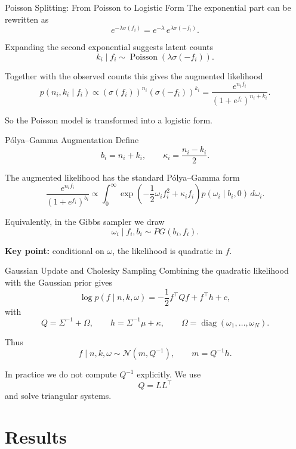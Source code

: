 \documentclass[11pt]{beamer}
\newcommand{\sigmoid}{\sigma}
\begin{document}
\begin{frame}{Poisson Splitting: From Poisson to Logistic Form}
The exponential part can be rewritten as
\[
e^{-\lambda\sigmoid(f_i)}
=
e^{-\lambda}\,e^{\lambda\sigmoid(-f_i)}.
\]

Expanding the second exponential suggests latent counts
\[
k_i\mid f_i \sim \operatorname{Poisson}(\lambda\sigmoid(-f_i)).
\]

Together with the observed counts this gives the augmented likelihood
\[
p(n_i,k_i\mid f_i)
\propto
\left(\sigmoid(f_i)\right)^{n_i}
\left(\sigmoid(-f_i)\right)^{k_i}
=
\frac{e^{n_i f_i}}{(1+e^{f_i})^{n_i+k_i}}.
\]

\medskip
So the Poisson model is transformed into a logistic form.
\end{frame}

\begin{frame}{P\'olya--Gamma Augmentation}
Define
\[
b_i=n_i+k_i,
\qquad
\kappa_i=\frac{n_i-k_i}{2}.
\]

The augmented likelihood has the standard P\'olya--Gamma form
\[
\frac{e^{n_i f_i}}{(1+e^{f_i})^{b_i}}
\propto
\int_0^\infty
\exp\left(
-\frac12\omega_i f_i^2 + \kappa_i f_i
\right)
p(\omega_i\mid b_i,0)\,d\omega_i.
\]

Equivalently, in the Gibbs sampler we draw
\[
\omega_i\mid f_i,b_i \sim PG(b_i,f_i).
\]

\medskip
\textbf{Key point:} conditional on $\omega$, the likelihood is quadratic in $f$.
\end{frame}

\begin{frame}{Gaussian Update and Cholesky Sampling}
Combining the quadratic likelihood with the Gaussian prior gives
\[
\log p(f\mid n,k,\omega)
=
-\frac12 f^\top Qf+f^\top h+c,
\]
with
\[
Q=\Sigma^{-1}+\Omega,
\qquad
h=\Sigma^{-1}\mu+\kappa,
\qquad
\Omega=\operatorname{diag}(\omega_1,\dots,\omega_N).
\]

Thus
\[
f\mid n,k,\omega \sim \mathcal N(m,Q^{-1}),
\qquad
m=Q^{-1}h.
\]

In practice we do not compute $Q^{-1}$ explicitly. We use
\[
Q=LL^\top
\]
and solve triangular systems.
\end{frame}

\section{Results}
\end{document}
